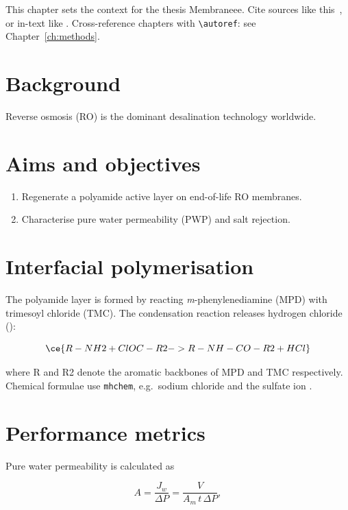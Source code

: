 This chapter sets the context for the thesis Membraneee. Cite sources like
this~\citep{example2021}, or in-text like \citet{example2021}. Cross-reference
chapters with \texttt{\textbackslash autoref}: see
Chapter~\ref{ch:methods}.


\section{Background}

Reverse osmosis (RO) is the dominant desalination technology worldwide.

\section{Aims and objectives}

\begin{enumerate}
  \item Regenerate a polyamide active layer on end-of-life RO membranes.
  \item Characterise pure water permeability (PWP) and salt rejection.
\end{enumerate}



\section{Interfacial polymerisation}

The polyamide layer is formed by reacting \emph{m}-phenylenediamine (MPD) with
trimesoyl chloride (TMC). The condensation reaction releases hydrogen chloride
():

\begin{equation}
  \ce{R-NH2 + ClOC-R2 -> R-NH-CO-R2 + HCl}
  \label{eq:ip}
\end{equation}

where R and R2 denote the aromatic backbones of MPD and TMC respectively.
Chemical formulae use \texttt{mhchem}, e.g.\ sodium chloride  and
the sulfate ion .

\section{Performance metrics}

Pure water permeability is calculated as

\begin{equation}
  A = \frac{J_w}{\Delta P} = \frac{V}{A_m \, t \, \Delta P},
  \label{eq:pwp}
\end{equation}


